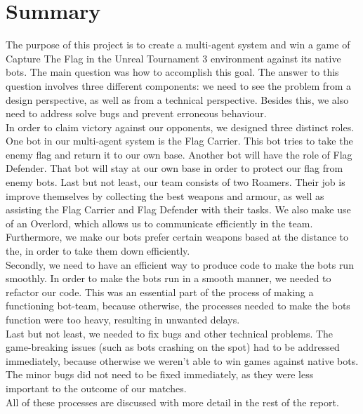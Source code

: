 \chapter*{Summary}
The purpose of this project is to create a multi-agent system and win a game of Capture The Flag in the Unreal Tournament 3 environment against its native bots. The main question was how to accomplish this goal. The answer to this question involves three different components: we need to see the problem from a design perspective, as well as from a technical perspective. Besides this, we also need to address solve bugs and prevent erroneous behaviour. \\

In order to claim victory against our opponents, we designed three distinct roles. One bot in our multi-agent system is the Flag Carrier. This bot tries to take the enemy flag and return it to our own base. Another bot will have the role of Flag Defender. That bot will stay at our own base in order to protect our flag from enemy bots. Last but not least, our team consists of two Roamers. Their job is improve themselves by collecting the best weapons and armour, as well as assisting the Flag Carrier and Flag Defender with their tasks. We also make use of an Overlord, which allows us to communicate efficiently in the team. Furthermore, we make our bots prefer certain weapons based at the distance to the, in order to take them down efficiently. \\

Secondly, we need to have an efficient way to produce code to make the bots run smoothly. In order to make the bots run in a smooth manner, we needed to refactor our code. This was an essential part of the process of making a functioning bot-team, because otherwise, the processes needed to make the bots function were too heavy, resulting in unwanted delays. \\

Last but not least, we needed to fix bugs and other technical problems. The game-breaking issues (such as bots crashing on the spot) had to be addressed immediately, because otherwise we weren't able to win games against native bots. The minor bugs did not need to be fixed immediately, as they were less important to the outcome of our matches. \\

All of these processes are discussed with more detail in the rest of the report.
